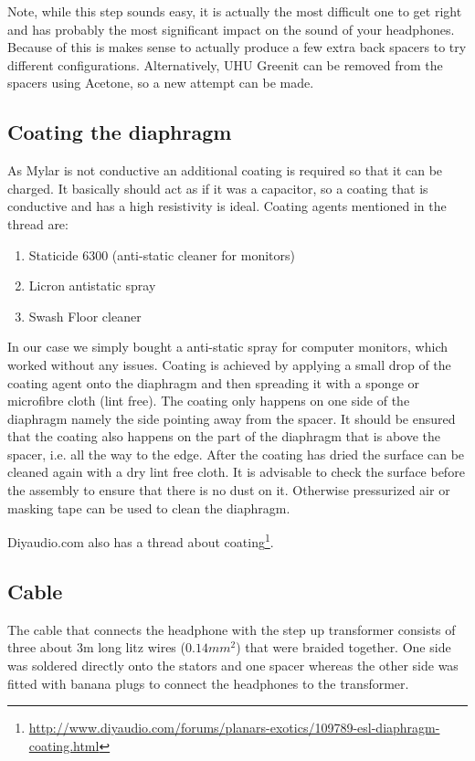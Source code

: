 \documentclass{article}
\begin{document}
Note, while this step sounds easy, it is actually the most difficult one to get right and has probably the most significant impact on the sound of your headphones. Because of this is makes sense to actually produce a few extra back spacers to try different configurations. Alternatively, UHU Greenit can be removed from the spacers using Acetone, so a new attempt can be made.


\subsection{Coating the diaphragm}
As Mylar is not conductive an additional coating is required so that it can be charged. It basically should act as if it was a capacitor, so a coating that is conductive and has a high resistivity is ideal. Coating agents mentioned in the thread are:
\begin{enumerate}
    \item Staticide 6300 (anti-static cleaner for monitors)
    \item Licron antistatic spray
    \item Swash Floor cleaner
\end{enumerate}
In our case we simply bought a anti-static spray for computer monitors, which worked without any issues. Coating is achieved by applying a small drop of the coating agent onto the diaphragm and then spreading it with a sponge or microfibre cloth (lint free). The coating only happens on one side of the diaphragm namely the side pointing away from the spacer. It should be ensured that the coating also happens on the part of the diaphragm that is above the spacer, i.e. all the way to the edge. After the coating has dried the surface can be cleaned again with a dry lint free cloth. It is advisable to check the surface before the assembly to ensure that there is no dust on it. Otherwise pressurized air or masking tape can be used to clean the diaphragm.

Diyaudio.com also has a thread about coating\footnote{\url{http://www.diyaudio.com/forums/planars-exotics/109789-esl-diaphragm-coating.html}}.

\subsection{Cable}
The cable that connects the headphone with the step up transformer consists of three about 3m long litz wires ($0.14mm^2$) that were braided together. One side was soldered directly onto the stators and one spacer whereas the other side was fitted with banana plugs to connect the headphones to the transformer.
\end{document}
